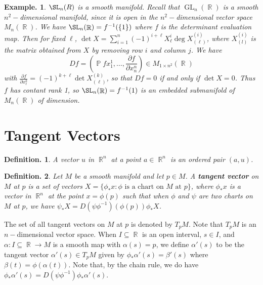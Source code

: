 \documentclass[11pt, a4paper]{memoir}
\DeclareMathOperator{\R}{{\mathbb{R}}}
\theoremstyle{change}
\theoremstyle{plain}
\theoremstyle{nonumberplain}
\newtheorem{definition}{Definition.}
\newtheorem{example}{Example.}
\DeclareMathOperator{\GL}{GL}
\DeclareMathOperator{\pr}{{\mathbb{P}}}
\newcommand{\prt}[2]{\ensuremath{\frac{\partial #1}{\partial #2}}}
\numberwithin{equation}{section}
\begin{document}
\begin{example}
    $\SL_n(R)$ is a smooth manifold.
    Recall that $\GL_n(\R)$ is a smooth $n^2-$dimensional manifold, since it is open in the $n^2-$dimensional vector space $M_n(\R)$.
    We have $\SL_n(\R)=f^{-1}(\{1\})$ where $f$ is the determinant evaluation map.
    Then for fixed $\ell$, $\det X=\sum_{i=1}^n(-1)^{i+\ell}X^i_\ell\deg X^{(i)}_{(\ell)}$, where $X^{(i)}_{(l)}$ is the matrix obtained from $X$ by removing row $i$ and column $j$.
    We have
    \begin{equation*}
        Df=\left(\pr{f}{x_1^1},\ldots,\prt{f}{x^n_n}\right)\in M_{1\times n^2}(\R)
    \end{equation*}
    with $\prt{f}{x^k_\ell}=(-1)^{k+\ell}\det X^{(k)}_{(\ell)}$, so that $Df=0$ if and only if $\det X=0$.
    Thus $f$ has contant rank 1, so $\SL_n(\R)=f^{-1}(1)$ is an embedded submanifold of $M_n(\R)$ of dimension.
\end{example}
\section{Tangent Vectors}
\begin{definition}
    A vector $u$ in $\R^n$ at a point $a\in\R^n$ is an ordered pair $(a,u)$.
\end{definition}
\begin{definition}
    Let $M$ be a smooth manifold and let $p\in M$.
    A \textbf{tangent vector} on $M$ at $p$ is a set of vectors $X=\{\phi_*x:\phi\text{ is a chart on $M$ at $p$}\}$, where $\phi_*x$ is a vector in $\R^n$ at the point $x=\phi(p)$ such that when $\phi$ and $\psi$ are two charts on $M$ at $p$, we have $\psi_*X=D(\psi\phi^{-1})(\phi(p))\phi_*X$.
\end{definition}
The set of all tangent vectors on $M$ at $p$ is denoted by $T_pM$.
Note that $T_pM$ is an $n-$dimensional vector space.
When $I\subseteq\R$ is an open interval, $s\in I$, and $\alpha:I\subseteq\R\to M$ is a smooth map with $\alpha(s)=p$, we define $\alpha'(s)$ to be the tangent vector $\alpha'(s)\in T_pM$ given by $\phi_*\alpha'(s)=\beta'(s)$ where $\beta(t)=\phi(\alpha(t))$.
Note that, by the chain rule, we do have $\phi_*\alpha'(s)=D(\psi\phi^{-1})\phi_*\alpha'(s)$.
\end{document}
